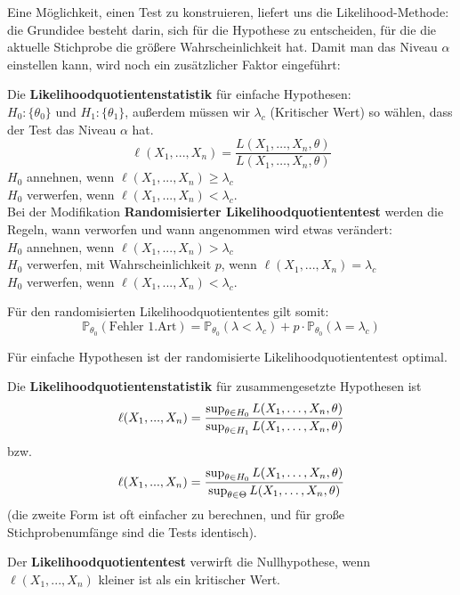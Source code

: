 Eine Möglichkeit, einen Test zu konstruieren, liefert uns die
Likelihood-Methode: die Grundidee besteht darin, sich für die
Hypothese zu entscheiden, für die die aktuelle Stichprobe die
größere Wahrscheinlichkeit hat. Damit man das Niveau $\alpha$ 
einstellen kann, wird noch ein zusätzlicher Faktor eingeführt:

\begin{definition}\label{def:likelihoodquotientenstatistik}
Die \textbf{Likelihoodquotientenstatistik} für einfache Hypothesen: \\
${H_0:\{\theta_0\}}$ und ${H_1:\{\theta_1\}}$, außerdem müssen wir $\lambda_c$ (Kritischer Wert) so wählen, dass der Test das Niveau $\alpha$ hat.
\[\ell(X_1,...,X_n)=\frac{L(X_1,\dots,X_n,\theta)}{L(X_1,\dots,X_n,\theta)}\]
$H_0$ annehnen, wenn $\ell(X_1,...,X_n)\geq\lambda_c$ \\
$H_0$ verwerfen, wenn $\ell(X_1,...,X_n)<\lambda_c$.\\

Bei der Modifikation \textbf{Randomisierter Likelihoodquotiententest} werden die Regeln, wann verworfen und wann angenommen wird etwas verändert:\\
$H_0$ annehnen, wenn $\ell(X_1,...,X_n)>\lambda_c$ \\
$H_0$ verwerfen, mit Wahrscheinlichkeit $p$, wenn $\ell(X_1,...,X_n)=\lambda_c$ \\
$H_0$ verwerfen, wenn $\ell(X_1,...,X_n)<\lambda_c$.
\end{definition}

Für den randomisierten Likelihoodquotiententes gilt somit:
\[\mathbb{P}_{\theta_0}(\text{Fehler 1.Art})=\mathbb{P}_{\theta_0}(\lambda<\lambda_c)+p\cdot\mathbb{P}_{\theta_0}(\lambda=\lambda_c)\]

\begin{satz}
Für einfache Hypothesen ist der randomisierte Likelihoodquotiententest optimal.
\end{satz}

\ifdefined\uebsps
\newExercPage

\fi

\begin{definition}
Die \textbf{Likelihoodquotientenstatistik} für zusammengesetzte Hypothesen ist
\[\ell(X_1,...,X_n)={\sup_{\theta\in H_0}L(X_1,\dots,X_n,\theta)\over
\sup_{\theta\in H_1}L(X_1,\dots,X_n,\theta)}\]
bzw.
\[\ell(X_1,...,X_n)={\sup_{\theta\in H_0}L(X_1,\dots,X_n,\theta)\over
\sup_{\theta\in \Theta}L(X_1,\dots,X_n,\theta)}\]
(die zweite Form ist oft einfacher zu berechnen, und für große
Stichprobenumfänge sind die Tests identisch).

Der \textbf{Likelihoodquotiententest} verwirft die Nullhypothese, wenn $\ell(X_1,...,X_n)$
kleiner ist als ein kritischer Wert.
\end{definition}

